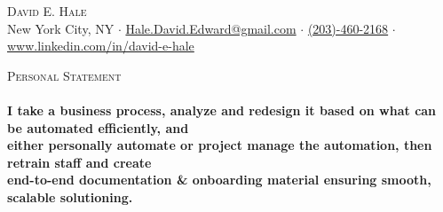 \documentclass[a4paper]{article}
\newcommand{\lineunder} {
    \vspace*{-8pt} \\
    \hspace*{-18pt} \hrulefill \\
}
\newcommand{\header} [1] {
    {\hspace*{-18pt}\vspace*{6pt} \textsc{#1}}
    \vspace*{-6pt} \lineunder
}
\begin{document}
\vspace*{-40pt}

    

\vspace*{-9pt}
\begin{center}
	{\Large \scshape {David E. Hale}}\\
	New York City, NY $\cdot$ \href{mailto:Hale.David.Edward@gmail.com}{Hale.David.Edward@gmail.com} $\cdot$ \href{tel:203-460-2168}{(203)-460-2168} $\cdot$ \href{www.linkedin.com/in/david-e-hale}{www.linkedin.com/in/david-e-hale}
\end{center}

\header{Personal Statement}
\vspace{1mm}
\hspace*{-14pt}\textbf{I take a business process, analyze and redesign it based on what can be automated efficiently, and\\
\hspace*{-14pt}either personally automate or project manage the automation, then retrain staff and create\\
\hspace*{-14pt}end-to-end documentation \& onboarding material ensuring smooth, scalable solutioning.
}
\end{document}
